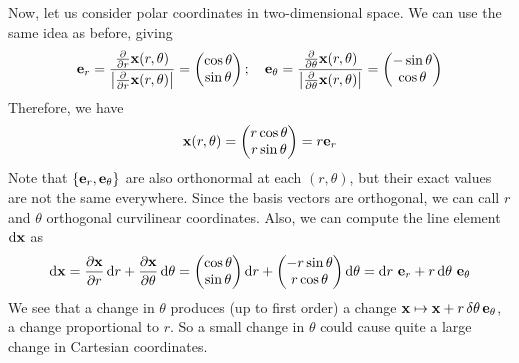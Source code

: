 Now, let us consider polar coordinates in two-dimensional space.
We can use the same idea as before, giving
\[
	\vb e_r = \frac{\frac{\partial}{\partial r} \vb x(r, \theta)}{\abs{\frac{\partial}{\partial r} \vb x(r, \theta)}} = \begin{pmatrix}
		\cos\theta \\ \sin\theta
	\end{pmatrix};\quad \vb e_\theta = \frac{\frac{\partial}{\partial \theta} \vb x(r, \theta)}{\abs{\frac{\partial}{\partial \theta} \vb x(r, \theta)}} = \begin{pmatrix}
		-\sin\theta \\ \cos\theta
	\end{pmatrix}
\]
Therefore, we have
\[
	\vb x(r, \theta) = \begin{pmatrix}
		r \cos\theta \\ r \sin\theta
	\end{pmatrix} = r\vb e_r
\]
Note that \(\{\vb e_r, \vb e_\theta\}\) are also orthonormal at each \((r, \theta)\), but their exact values are not the same everywhere.
Since the basis vectors are orthogonal, we can call \(r\) and \(\theta\) orthogonal curvilinear coordinates.
Also, we can compute the line element \(\dd \vb x\) as
\[
	\dd \vb x = \frac{\partial \vb x}{\partial r} \dd{r} + \frac{\partial \vb x}{\partial \theta} \dd{\theta} = \begin{pmatrix}
		\cos \theta \\ \sin \theta
	\end{pmatrix} \dd{r} + \begin{pmatrix}
		-r \sin \theta \\ r \cos \theta
	\end{pmatrix} \dd{\theta} = \dd{r} \, \vb e_r + r\dd{\theta} \, \vb e_\theta
\]
We see that a change in \(\theta\) produces (up to first order) a change \(\vb x \mapsto \vb x + r \,\delta \theta \,\vb e_\theta\), a change proportional to \(r\).
So a small change in \(\theta\) could cause quite a large change in Cartesian coordinates.


